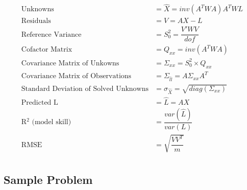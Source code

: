 \begin{align*}
	\text{Unknowns} &= \hat{X} = inv(A^TWA)A^TWL\\
	\text{Residuals} &= V = AX - L\\
	\text{Reference Variance} &= S_0^2 = \dfrac{V'WV}{dof} \\
	\text{Cofactor Matrix} &= Q_{xx} = inv(A^TWA) \\
	\text{Covariance Matrix of Unkowns} &= \Sigma_{xx} = S_0^2 \times Q_{xx} \\
	\text{Covariance Matrix of Observations} &= \Sigma_{\hat{l}\hat{l}} = A \Sigma_{xx} A^T \\
	\text{Standard Deviation of Solved Unknowns} &= \sigma_{\hat{X}} = \sqrt{diag(\Sigma_{xx})} \\
	\text{Predicted L} &= \hat{L} = AX \\
	\text{R$^2$ (model skill)} &= \dfrac{var(\hat{L})}{var(L)} \\
	\text{RMSE } &= \sqrt{\dfrac{VV^T}{m}} \\
\end{align*}
\clearpage

\subsection{Sample Problem}


